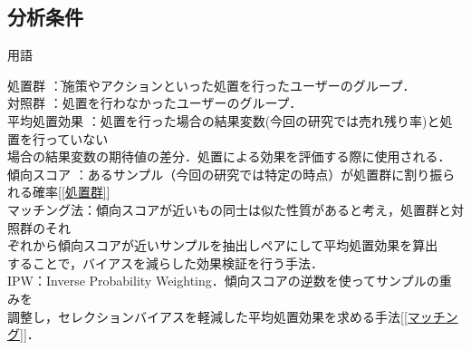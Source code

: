\documentclass[dvipdfmx]{jreport}
\begin{document}
\subsection{分析条件}
\label{envi}
\begin{itembox}[l]{\large{用語}}
    \begin{tabbing}
        \hspace{15pt} \raisebox{0.5ex}{\tiny $\bullet$} 処置群 \hspace{28pt}\=：施策やアクションといった処置を行ったユーザーのグループ．\\[0.5em]
        \hspace{15pt} \raisebox{0.5ex}{\tiny $\bullet$} 対照群 \>：処置を行わなかったユーザーのグループ．\\[0.5em]
        \hspace{15pt} \raisebox{0.5ex}{\tiny $\bullet$} 平均処置効果 \>：処置を行った場合の結果変数(今回の研究では売れ残り率)と処置を行っていない\\[0.5em]\>\hspace{6.5pt}場合の結果変数の期待値の差分．処置による効果を評価する際に使用される．\\[0.5em]
        \hspace{15pt} \raisebox{0.5ex}{\tiny $\bullet$} 傾向スコア \>：あるサンプル（今回の研究では特定の時点）が処置群に割り振られる確率[\ref{処置群}]\\[0.5em]
        \hspace{15pt} \raisebox{0.5ex}{\tiny $\bullet$} マッチング法\>：傾向スコアが近いもの同士は似た性質があると考え，処置群と対照群のそれ\\[0.5em]\>\hspace{6.5pt}ぞれから傾向スコアが近いサンプルを抽出しペアにして平均処置効果を算出\\[0.5em]\>\hspace{6.5pt}することで，バイアスを減らした効果検証を行う手法．\\[0.5em]
        \hspace{15pt} \raisebox{0.5ex}{\tiny $\bullet$} IPW\>：Inverse Probability Weighting．傾向スコアの逆数を使ってサンプルの重みを\\[0.5em]\>\hspace{6.5pt}調整し，セレクションバイアスを軽減した平均処置効果を求める手法[\ref{マッチング}]．
    \end{tabbing}
\end{itembox}
\end{document}
